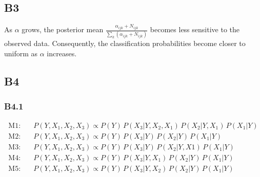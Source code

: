 \documentclass{article}
\begin{document}
\subsection*{B3}
\label{sec:B:B3}

As $\alpha$ grows, the posterior mean $\frac{\alpha_{ijk} + N_{ijk}}{\sum_k (\alpha_{ijk} + N_{ijk})}$ becomes less sensitive to the observed data. Consequently, the classification probabilities become closer to uniform as $\alpha$ increases. 

\subsection*{B4}
\label{sec:B:B4}

\subsubsection*{B4.1}
\label{sec:B:B4:1}

\begin{align*}
    \text{M1} :&\quad P(Y,X_1,X_2,X_3) \propto P(Y) \, P(X_3|Y,X_2,X_1) \, P(X_2|Y,X_1) \, P(X_1|Y) \\
    \text{M2} :&\quad P(Y,X_1,X_2,X_3) \propto P(Y) \, P(X_3|Y) \, P(X_2|Y) \, P(X_1|Y) \\
    \text{M3} :&\quad P(Y,X_1,X_2,X_3) \propto P(Y) \, P(X_3|Y) \, P(X_2|Y,X1) \, P(X_1|Y) \\
    \text{M4} :&\quad P(Y,X_1,X_2,X_3) \propto P(Y) \, P(X_3|Y,X_1) \, P(X_2|Y) \, P(X_1|Y) \\
    \text{M5} :&\quad P(Y,X_1,X_2,X_3) \propto P(Y) \, P(X_3|Y,X_2) \, P(X_2|Y) \, P(X_1|Y) \\
\end{align*}
\end{document}
